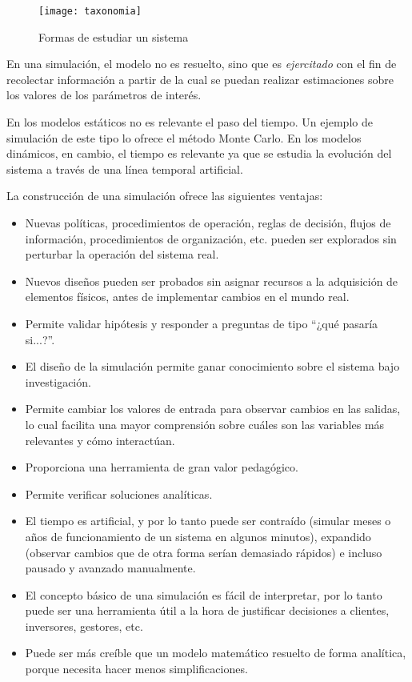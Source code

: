 \begin{figure}[h]
\caption{Formas de estudiar un sistema \cite{law}}
\centering
\texttt{[image: taxonomia]}
\end{figure}

En una simulación, el modelo no es resuelto, sino que es \textit{ejercitado}
con el fin de recolectar información a partir de la cual se puedan realizar
estimaciones sobre los valores de los parámetros de interés.


En los modelos estáticos no es relevante el paso del tiempo. Un ejemplo de
simulación de este tipo lo ofrece el método Monte Carlo. En los modelos
dinámicos, en cambio, el tiempo es relevante ya que se estudia la evolución del
sistema a través de una línea temporal artificial.

La construcción de una simulación ofrece las siguientes ventajas:
\begin{itemize}
    \item Nuevas políticas, procedimientos de operación, reglas de decisión,
    flujos de información, procedimientos de organización, etc. pueden ser
    explorados sin perturbar la operación del sistema real.

    \item Nuevos diseños pueden ser probados sin asignar recursos a la
    adquisición de elementos físicos, antes de implementar cambios en el mundo
    real.

    \item Permite validar hipótesis y responder a preguntas de tipo ``¿qué
    pasaría si...?''.

    \item El diseño de la simulación permite ganar conocimiento sobre el
    sistema bajo investigación.

    \item Permite cambiar los valores de entrada para observar cambios en las
    salidas, lo cual facilita una mayor comprensión sobre cuáles son las
    variables más relevantes y cómo interactúan.

    \item Proporciona una herramienta de gran valor pedagógico.

    \item Permite verificar soluciones analíticas.

    \item El tiempo es artificial, y por lo tanto puede ser contraído (simular
    meses o años de funcionamiento de un sistema en algunos minutos), expandido
    (observar cambios que de otra forma serían demasiado rápidos) e incluso
    pausado y avanzado manualmente.

    \item El concepto básico de una simulación es fácil de interpretar, por lo
    tanto puede ser una herramienta útil a la hora de justificar decisiones a
    clientes, inversores, gestores, etc.

    \item Puede ser más creíble que un modelo matemático resuelto de forma
    analítica, porque necesita hacer menos simplificaciones.
\end{itemize}

